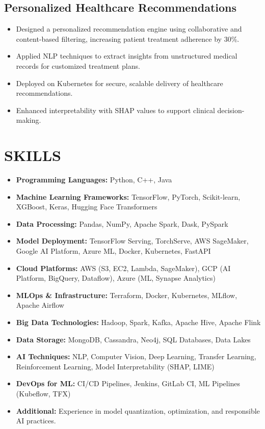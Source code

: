 \documentclass[12pt,a4paper]{article}
\begin{document}
\subsection*{Personalized Healthcare Recommendations}
\begin{itemize}[leftmargin=*,noitemsep,topsep=0pt]
  \item Designed a personalized recommendation engine using collaborative and content-based filtering, increasing patient treatment adherence by 30\%.
  \item Applied NLP techniques to extract insights from unstructured medical records for customized treatment plans.
  \item Deployed on Kubernetes for secure, scalable delivery of healthcare recommendations.
  \item Enhanced interpretability with SHAP values to support clinical decision-making.
\end{itemize}

\section*{SKILLS}
\begin{itemize}[leftmargin=*,noitemsep,topsep=0pt]
  \item \textbf{Programming Languages:} Python, C++, Java
  \item \textbf{Machine Learning Frameworks:} TensorFlow, PyTorch, Scikit-learn, XGBoost, Keras, Hugging Face Transformers
  \item \textbf{Data Processing:} Pandas, NumPy, Apache Spark, Dask, PySpark
  \item \textbf{Model Deployment:} TensorFlow Serving, TorchServe, AWS SageMaker, Google AI Platform, Azure ML, Docker, Kubernetes, FastAPI
  \item \textbf{Cloud Platforms:} AWS (S3, EC2, Lambda, SageMaker), GCP (AI Platform, BigQuery, Dataflow), Azure (ML, Synapse Analytics)
  \item \textbf{MLOps \& Infrastructure:} Terraform, Docker, Kubernetes, MLflow, Apache Airflow
  \item \textbf{Big Data Technologies:} Hadoop, Spark, Kafka, Apache Hive, Apache Flink
  \item \textbf{Data Storage:} MongoDB, Cassandra, Neo4j, SQL Databases, Data Lakes
  \item \textbf{AI Techniques:} NLP, Computer Vision, Deep Learning, Transfer Learning, Reinforcement Learning, Model Interpretability (SHAP, LIME)
  \item \textbf{DevOps for ML:} CI/CD Pipelines, Jenkins, GitLab CI, ML Pipelines (Kubeflow, TFX)
  \item \textbf{Additional:} Experience in model quantization, optimization, and responsible AI practices.
\end{itemize}
\end{document}

